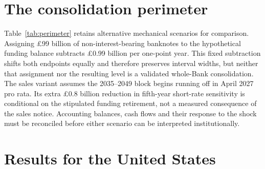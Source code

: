 \documentclass[11pt,a4paper]{article}
\theoremstyle{remark}
\begin{document}
\begin{table}[t]\centering\small
\caption{Width of the identified interval, £ billion, when a specified reporting package is added to the GFS residual-maturity template (gross perimeter).}\label{tab:value2}
\resizebox{0.92\textwidth}{!}{}
\end{table}

\begin{table}[t]\centering\small
\caption{First-year cost of a one-point rise in all rates, £ billion: the GFS template plus the amount (to £0.1 billion) and mean maturity of debt due within a year, at different publication precisions.}\label{tab:precision}
\resizebox{\textwidth}{!}{}
\end{table}

\section{The consolidation perimeter}\label{sec:perimeter}

Table~\ref{tab:perimeter} retains alternative mechanical scenarios for comparison. Assigning £99 billion of non-interest-bearing banknotes to the hypothetical funding balance subtracts £0.99 billion per one-point year. This fixed subtraction shifts both endpoints equally and therefore preserves interval widths, but neither that assignment nor the resulting level is a validated whole-Bank consolidation. The sales variant assumes the 2035--2049 block begins running off in April 2027 pro rata. Its extra £0.8 billion reduction in fifth-year short-rate sensitivity is conditional on the stipulated funding retirement, not a measured consequence of the sales notice. Accounting balances, cash flows and their response to the shock must be reconciled before either scenario can be interpreted institutionally.

\begin{table}[t]\centering\small
\caption{Instrument-level values under alternative synthetic funding allocations and runoff scenarios, £ billion. These are imposed scenarios, not validated institutional perimeters.}\label{tab:perimeter}
\resizebox{\textwidth}{!}{}
\end{table}

\section{Results for the United States}\label{sec:us}
\end{document}
